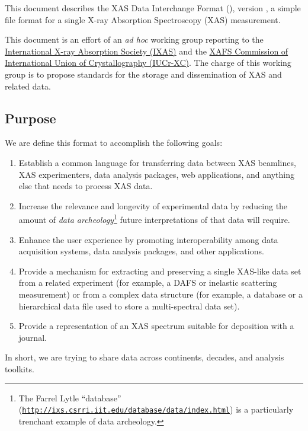\documentclass{article}
\begin{document}
This document describes the XAS Data Interchange Format ({\xdi}),
version \xdiversion, a simple file format for a single X-ray
Absorption Spectroscopy (XAS) measurement.

This document is an effort of an \textit{ad hoc} working group
reporting to the \href{http://www.ixasportal.net/}{International X-ray
  Absorption Society (IXAS)} and the
\href{http://www.iucr.org/resources/commissions/xafs}{XAFS Commission
  of International Union of Crystallography (IUCr-XC)}.  The charge of
this working group is to propose standards for the storage and
dissemination of XAS and related data.


\subsection{Purpose}
\label{sec:purpose}

We are define this format to accomplish the following goals:

\begin{enumerate}
\item Establish a common language for transferring data between XAS
  beamlines, XAS experimenters, data analysis packages, web
  applications, and anything else that needs to process XAS data.
\item Increase the relevance and longevity of experimental data by
  reducing the amount of \textit{data archeology}\footnote{The Farrel
    Lytle ``database''
    (\href{http://ixs.csrri.iit.edu/database/data/index.html}
    {\texttt{http://ixs.csrri.iit.edu/database/data/index.html}}) is a
    particularly trenchant example of data archeology.} future
  interpretations of that data will require.
\item Enhance the user experience by promoting interoperability among
  data acquisition systems, data analysis packages, and other
  applications.
\item Provide a mechanism for extracting and preserving a single
  XAS-like data set from a related experiment (for example, a DAFS or
  inelastic scattering measurement) or from a complex data structure
  (for example, a database or a hierarchical data file used to store a
  multi-spectral data set).
\item Provide a representation of an XAS spectrum suitable for
  deposition with a journal.
\end{enumerate}

In short, we are trying to share data across continents, decades, and
analysis toolkits.
\end{document}
